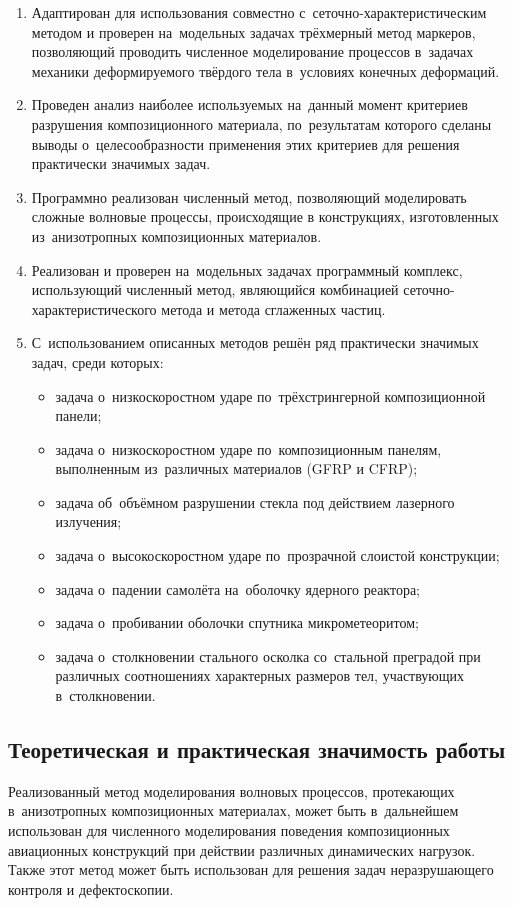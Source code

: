 \documentclass[thesis.tex]{subfiles}
\begin{document}
\begin{enumerate}
    \item Адаптирован для использования совместно с~сеточно-характерис\-ти\-чес\-ким методом и проверен на~модельных
          задачах трёхмерный метод маркеров, позволяющий проводить численное моделирование процессов в~задачах механики
          деформируемого твёрдого тела в~условиях конечных деформаций.
    \item Проведен анализ наиболее используемых на~данный момент критериев разрушения композиционного
          материала, по~результатам которого сделаны выводы о~целесообразности применения этих критериев для решения практически
          значимых задач.
    \item Программно реализован численный метод, позволяющий моделировать сложные волновые процессы, происходящие в конструкциях,
          изготовленных из~анизотропных композиционных материалов.
    \item Реализован и проверен на~модельных задачах программный комплекс, использующий численный метод,
          являющийся комбинацией сеточно-характеристического метода и метода сглаженных частиц.
    \item С~использованием описанных методов решён ряд практически значимых задач, среди которых:
        \begin{itemize}
            \item задача о~низкоскоростном ударе по~трёхстрингерной композиционной панели;
            \item задача о~низкоскоростном ударе по~композиционным панелям, выполненным из~различных материалов
                  (GFRP и CFRP);
            \item задача об~объёмном разрушении стекла под действием лазерного излучения;
            \item задача о~высокоскоростном ударе по~прозрачной слоистой конструкции;
            \item задача о~падении самолёта на~оболочку ядерного реактора;
            \item задача о~пробивании оболочки спутника микрометеоритом;
            \item задача о~столкновении стального осколка со~стальной преградой при различных соотношениях
                  характерных размеров  тел, участвующих в~столкновении.
        \end{itemize}
\end{enumerate}

\subsection*{Теоретическая и практическая значимость работы}
Реализованный метод моделирования волновых процессов, протекающих в~анизотропных композиционных материалах, может быть
в~дальнейшем использован  для численного моделирования поведения композиционных авиационных конструкций при действии
различных динамических  нагрузок. Также этот метод может быть использован для решения задач неразрушающего контроля и
дефектоскопии.
\end{document}
